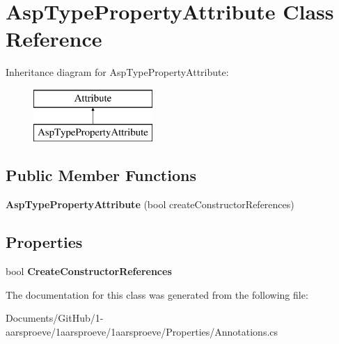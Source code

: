 \hypertarget{class_asp_type_property_attribute}{}\section{Asp\+Type\+Property\+Attribute Class Reference}
\label{class_asp_type_property_attribute}
Inheritance diagram for Asp\+Type\+Property\+Attribute\+:\begin{figure}[H]
\begin{center}
\leavevmode
\includegraphics[height=2.000000cm]{class_asp_type_property_attribute}
\end{center}
\end{figure}
\subsection*{Public Member Functions}
\begin{DoxyCompactItemize}
\item 
\hypertarget{class_asp_type_property_attribute_a44e918652832a5c2272af6b3c85d12d1}{}{\bfseries Asp\+Type\+Property\+Attribute} (bool create\+Constructor\+References)\label{class_asp_type_property_attribute_a44e918652832a5c2272af6b3c85d12d1}

\end{DoxyCompactItemize}
\subsection*{Properties}
\begin{DoxyCompactItemize}
\item 
\hypertarget{class_asp_type_property_attribute_a57bbcf991d77058648e6292b63726241}{}bool {\bfseries Create\+Constructor\+References}\label{class_asp_type_property_attribute_a57bbcf991d77058648e6292b63726241}

\end{DoxyCompactItemize}


The documentation for this class was generated from the following file\+:\begin{DoxyCompactItemize}
\item 
Documents/\+Git\+Hub/1-\/aarsproeve/1aarsproeve/1aarsproeve/\+Properties/Annotations.\+cs\end{DoxyCompactItemize}
